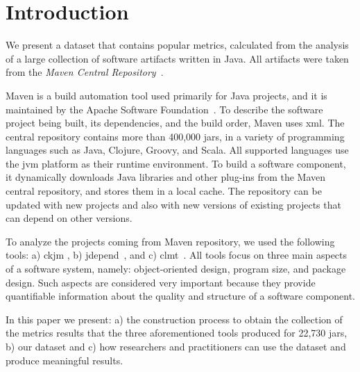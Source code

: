 \documentclass[conference]{IEEEtran}
\begin{document}

%

\section{Introduction}
\label{sec:intro}

We present a dataset that contains popular metrics, calculated from the analysis of a large collection of software artifacts written in Java. All artifacts were taken from the {\it Maven Central Repository}~\cite{MAVEN}.

Maven is a build automation tool used primarily for Java projects, and it is maintained by the Apache Software Foundation~\cite{MAVEN}. To describe the software project being built, its dependencies, and the build order, Maven uses {\sc xml}. The central repository contains more than 400,000 {\sc jar}s, in a variety of programming languages such as Java, Clojure, Groovy, and Scala. All supported languages use the {\sc jvm} platform as their runtime environment. To build a software component, it dynamically downloads Java libraries and other plug-ins from the Maven central repository, and stores them in a local cache. The repository can be updated with new projects and also with new versions of existing projects that can depend on other versions.

To analyze the projects coming from Maven repository, we used the following tools: a) {\sc ckjm} \cite{Spi05g}, b) {\sc jd}epend~\cite{JDEPEND}, and c) {\sc clmt}~\cite{SGKL09}. All tools focus on three main aspects of a software system, namely: object-oriented design, program size, and package design. Such aspects are considered very important because they provide quantifiable information about the quality and structure of a software component.

In this paper we present: a) the construction process to obtain the collection of the metrics results that the three aforementioned tools produced for 22,730 {\sc jar}s, b) our dataset and c) how researchers and practitioners can use the dataset and produce meaningful results.
\end{document}
